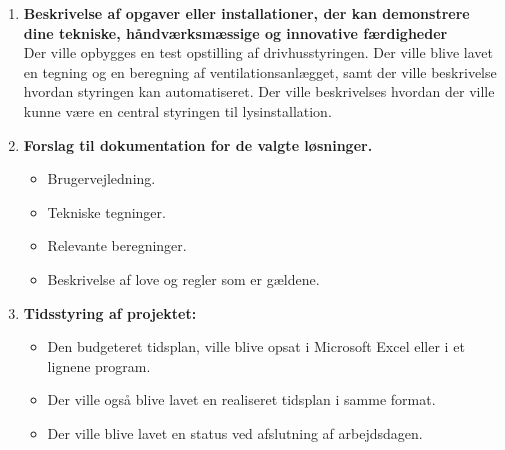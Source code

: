 \begin{enumerate}
    \item \textbf{Beskrivelse af opgaver eller installationer, der kan demonstrere dine tekniske,
    håndværksmæssige og innovative færdigheder} \\ 
    Der ville opbygges en test opstilling af drivhusstyringen. Der ville blive lavet en tegning og en beregning af ventilationsanlægget, samt der ville beskrivelse hvordan styringen kan automatiseret. Der ville beskrivelses hvordan der ville kunne være en central styringen til lysinstallation.
 
    \item \textbf{Forslag til dokumentation for de valgte løsninger.}
    \begin{itemize}
        \item Brugervejledning.
        \item Tekniske tegninger.
        \item Relevante beregninger.
        \item Beskrivelse af love og regler som er gældene.
    \end{itemize}
    \item \textbf{Tidsstyring af projektet:}
    \begin{itemize}
        \item Den budgeteret tidsplan, ville blive opsat i Microsoft Excel eller i et lignene program.
        \item Der ville også blive lavet en realiseret tidsplan i samme format.
        \item Der ville blive lavet en status ved afslutning af arbejdsdagen.
    \end{itemize}
   
\end{enumerate}
